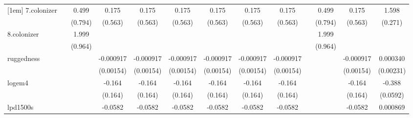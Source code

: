 {\begin{tabular}{l*{12}{c}}
[1em]
7.colonizer &                     &       0.499         &       0.175         &       0.175         &       0.175         &       0.175         &       0.175         &       0.175         &                     &       0.499         &       0.175         &       1.598\sym{***}\\
            &                     &     (0.794)         &     (0.563)         &     (0.563)         &     (0.563)         &     (0.563)         &     (0.563)         &     (0.563)         &                     &     (0.794)         &     (0.563)         &     (0.271)         \\
[1em]
8.colonizer &                     &       1.999\sym{*}  &                     &                     &                     &                     &                     &                     &                     &       1.999\sym{*}  &                     &                     \\
            &                     &     (0.964)         &                     &                     &                     &                     &                     &                     &                     &     (0.964)         &                     &                     \\
[1em]
ruggedness  &                     &                     &   -0.000917         &   -0.000917         &   -0.000917         &   -0.000917         &   -0.000917         &   -0.000917         &                     &                     &   -0.000917         &    0.000340         \\
            &                     &                     &   (0.00154)         &   (0.00154)         &   (0.00154)         &   (0.00154)         &   (0.00154)         &   (0.00154)         &                     &                     &   (0.00154)         &   (0.00231)         \\
[1em]
logem4      &                     &                     &      -0.164         &      -0.164         &      -0.164         &      -0.164         &      -0.164         &      -0.164         &                     &                     &      -0.164         &      -0.388\sym{***}\\
            &                     &                     &     (0.164)         &     (0.164)         &     (0.164)         &     (0.164)         &     (0.164)         &     (0.164)         &                     &                     &     (0.164)         &    (0.0592)         \\
[1em]
lpd1500s    &                     &                     &     -0.0582         &     -0.0582         &     -0.0582         &     -0.0582         &     -0.0582         &     -0.0582         &                     &                     &     -0.0582         &    0.000869         \\

\end{tabular}}

